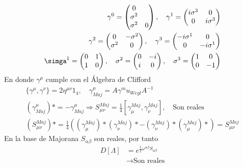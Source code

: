 \documentclass[../main.tex]{subfiles}
\begin{document}
\begin{align*}
  \gamma^0 = \begin{pmatrix}
    0 \\ \sigma^2 \\ \sigma^2 & 0
  \end{pmatrix}, \quad \gamma^1 = \begin{pmatrix}
    i\sigma^3 & 0 \\ 0 & i\sigma^3
  \end{pmatrix}
  \\
  \gamma^2 = \begin{pmatrix}
    0 & -\sigma^2 \\ \sigma^2 & 0
  \end{pmatrix}, \quad 
  \gamma^3 = \begin{pmatrix}
    -i \sigma^1 & 0 \\ 0 & -i\sigma^1
  \end{pmatrix}
  \\ 
  \simga^1 = \begin{pmatrix}
    0 & 1 \\ 1 & 0
  \end{pmatrix}, \quad \sigma^2 = \begin{pmatrix}
    0 & -i \\ i & 0 
  \end{pmatrix}
  , \quad \sigma^3 = 
  \begin{pmatrix}
    1 & 0 \\ 0 & -1
  \end{pmatrix}
\end{align*} 
En donde $\gamma^\mu$ cumple con el Álgebra de Clifford
\begin{align*}
  \{\gamma^\mu , \gamma^\nu\} = 2\eta^{\mu \nu}1_4, \quad \gamma^\mu_{Maj} = A \gamma^mu_{Weyl}A^{-1} \\
  \left( \gamma^\mu_{Maj} \right)* = - \gamma^\mu_{Maj} \Rightarrow S^{Maj}_{\mu \nu} = \frac{1}{4} \left[ \gamma^{Maj}_\mu , \gamma^{Maj}_{\nu} \right], \quad \text{Son reales} \\
  \left( S^{Maj}_{\mu\nu} \right)* = \frac{1}{4} \left( \left( \gamma^{Maj}_{\mu} \right)* \left( \gamma_\nu^{Maj} \right)* - \left( \gamma^{Maj}_\nu \right)* \left( \gamma^{Maj}_\mu \right)*\right) = S^{Maj}_{\mu \nu}
\end{align*}
En la base de Majorana $S_{\alpha \beta}$ son reales, por tanto
\begin{align*}
  D[\Lambda] & = e^{\frac{1}{2}\omega^{\alpha \beta}S_{\alpha \beta}} \\
  & \rightarrow \text{Son reales}
\end{align*}
\end{document}
